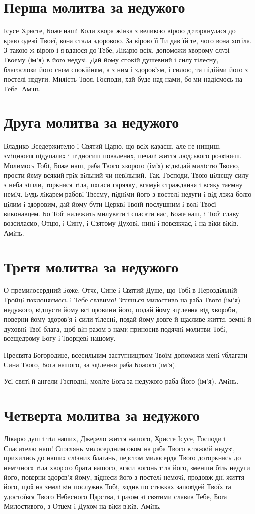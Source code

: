 \documentclass[chapters.tex]{subfiles}
\begin{document}
\section{Перша молитва за недужого}
Ісусе Христе, Боже наш! Коли хвора жінка з великою вірою доторкнулася до краю одежі Твоєї, вона стала здоровою. За вірою її Ти дав їй те, чого вона хотіла. З такою ж вірою і я вдаюся до Тебе, Лікарю всіх, допоможи хворому слузі Твоєму (ім’я) в його недузі. Дай йому спокій душевний і силу тілесну, благослови його сном спокійним, а з ним і здоров’ям, і силою, та підійми його з постелі недуги. Милість Твоя, Господи, хай буде над нами, бо ми надіємось на Тебе. Амінь.

\section{Друга молитва за недужого}
Владико Вседержителю i Святий Царю, що всiх караєш, але не нищиш, змiцнюєш пiдупалих i пiдносиш повалених, печалi життя людського розвiюєш. Молимось Тобi, Боже наш, раба Твого хворого (ім’я) вiдвiдай милiстю Твоєю, прости йому всякий грiх вiльний чи невiльний. Так, Господи, Твою цiлющу силу з неба зiшли, торкнися тiла, погаси гарячку, вгамуй страждання i всяку таємну немiч. Будь лiкарем рабовi Твоєму, пiднiми його з постелi недуги i вiд ложа болю цiлим i здоровим, дай йому бути Церквi Твоїй послушним i волi Твоєї виконавцем. Бо Тобi належить милувати i спасати нас, Боже наш, i Тобi славу возсилаємо, Отцю, i Сину, i Святому Духовi, нинi i повсякчас, i на вiки вiкiв. Амiнь.

\section{Третя молитва за недужого}
О премилосердний Боже, Отче, Сине i Святий Душе, що Тобi в Нероздiльнiй Тройцi поклоняємось i Тебе славимо! Зглянься милостиво на раба Твого (ім’я) недужого, вiдпусти йому всi провини його, подай йому зцiлення вiд хвороби, поверни йому здоров’я i сили тiлеснi, подай йому довге й щасливе життя, земнi й духовнi Твої блага, щоб вiн разом з нами приносив подячнi молитви Тобi, всещедрому Богу i Творцевi нашому.

Пресвята Богородице, всесильним заступництвом Твоїм допоможи менi ублагати Сина Твого, Бога нашого, за зцiлення раба Божого (ім’я).

Усi святi й ангели Господнi, молiте Бога за недужого раба Його (ім’я). Амiнь.

\section{Четверта молитва за недужого}
Лiкарю душ i тiл наших, Джерело життя нашого, Христе Iсусе, Господи i Спасителю наш! Споглянь милосердним оком на раба Твого в тяжкiй недузi, прихились до наших слiзних благань, перстом милосердя Твого доторкнись до немiчного тiла хворого брата нашого, вгаси вогонь тiла його, зменши бiль недуги його, поверни здоров’я йому, пiднеси його з постелi немочi, продовж днi життя його, щоб на землi вiн послужив Тобi, ходив по стежках заповiдей Твоїх та удостоївся Твого Небесного Царства, i разом зi святими славив Тебе, Бога Милостивого, з Отцем i Духом на вiки вiкiв. Амiнь.
\end{document}
